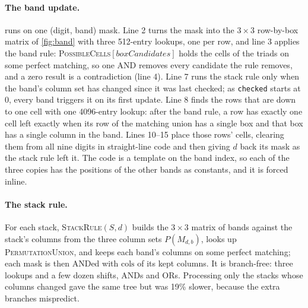 \documentclass[11pt]{article}
\theoremstyle{definition}
\theoremstyle{plain}
\let\origtextsc\textsc
\renewcommand{\textsc}[1]{\textup{\origtextsc{#1}}}
\begin{document}
\paragraph{The band update.}  runs on one (digit, band) mask. Line 2 turns the mask into the $3\times 3$
row-by-box matrix of \cref{fig:band} with three 512-entry lookups, one per row, and line 3 applies the band rule:
\textsc{PossibleCells}$[\mathit{boxCandidates}]$ holds the cells of the triads on some perfect matching, so one AND
removes every candidate the rule removes, and a zero result is a contradiction (line 4). Line 7 runs the stack rule only
when the band's column set has changed since it was last checked; as \texttt{checked} starts at 0, every band triggers
it on its first update. Line 8 finds the rows that are down to one cell with one 4096-entry lookup: after the band
rule, a row has exactly one cell left exactly when its row of the matching union has a single box and that box has a
single column in the band. Lines 10--15 place those rows' cells, clearing them from all nine digits in straight-line
code and then giving $d$ back its mask as the stack rule left it. The code is a template on the band index, so each of
the three copies has the positions of the other bands as constants, and it is forced inline.

\paragraph{The stack rule.} For each stack, \textsc{StackRule}$(S,d)$ builds the $3\times 3$ matrix of bands against
the stack's columns from the three column sets $P(M_{d,b})$, looks up \textsc{PermutationUnion}, and keeps each band's
columns on some perfect matching; each mask is then ANDed with $\mathrm{cols}$ of its kept columns. It is branch-free:
three lookups and a few dozen shifts, ANDs and ORs. Processing only the stacks whose columns changed gave the same tree
but was 19\% slower, because the extra branches mispredict.
\end{document}
